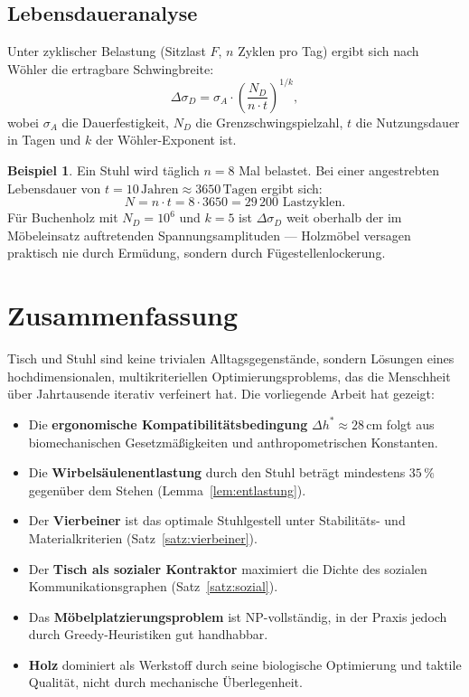 ﻿\documentclass[a4paper,12pt]{article}
\theoremstyle{definition}
\newtheorem{beispiel}{Beispiel}
\begin{document}
\subsection{Lebensdaueranalyse}

Unter zyklischer Belastung (Sitzlast $F$, $n$ Zyklen pro Tag) ergibt sich nach
W\"{o}hler die ertragbare Schwingbreite:
\[
	\Delta\sigma_D = \sigma_A \cdot \left(\frac{N_D}{n \cdot t}\right)^{1/k},
\]
wobei $\sigma_A$ die Dauerfestigkeit, $N_D$ die Grenzschwingspielzahl, $t$ die
Nutzungsdauer in Tagen und $k$ der W\"{o}hler-Exponent ist.

\begin{beispiel}
	Ein Stuhl wird t\"{a}glich $n = 8$ Mal belastet. Bei einer angestrebten Lebensdauer
	von $t = 10\,\text{Jahren} \approx 3650\,\text{Tagen}$ ergibt sich:
	\[
		N = n \cdot t = 8 \cdot 3650 = 29\,200 \text{ Lastzyklen.}
	\]
	F\"{u}r Buchenholz mit $N_D = 10^6$ und $k = 5$ ist $\Delta\sigma_D$ weit oberhalb
	der im M\"{o}beleinsatz auftretenden Spannungsamplituden --- Holzm\"{o}bel versagen
	praktisch nie durch Erm\"{u}dung, sondern durch F\"{u}gestellenlockerung.
\end{beispiel}

\section{Zusammenfassung}

Tisch und Stuhl sind keine trivialen Alltagsgegenst\"{a}nde, sondern L\"{o}sungen eines
hochdimensionalen, multikriteriellen Optimierungsproblems, das die Menschheit \"{u}ber
Jahrtausende iterativ verfeinert hat. Die vorliegende Arbeit hat gezeigt:
\begin{itemize}
	\item Die \textbf{ergonomische Kompatibilit\"{a}tsbedingung}
	      $\Delta h^* \approx 28\,\mathrm{cm}$ folgt aus biomechanischen
	      Gesetzm\"{a}\ss{}igkeiten und anthropometrischen Konstanten.
	\item Die \textbf{Wirbels\"{a}ulenentlastung} durch den Stuhl betr\"{a}gt mindestens
	      $35\,\%$ gegen\"{u}ber dem Stehen (Lemma~\ref{lem:entlastung}).
	\item Der \textbf{Vierbeiner} ist das optimale Stuhlgestell unter Stabilit\"{a}ts- und
	      Materialkriterien (Satz~\ref{satz:vierbeiner}).
	\item Der \textbf{Tisch als sozialer Kontraktor} maximiert die Dichte des sozialen
	      Kommunikationsgraphen (Satz~\ref{satz:sozial}).
	\item Das \textbf{M\"{o}belplatzierungsproblem} ist NP-vollst\"{a}ndig, in der Praxis
	      jedoch durch Greedy-Heuristiken gut handhabbar.
	\item \textbf{Holz} dominiert als Werkstoff durch seine biologische Optimierung und
	      taktile Qualit\"{a}t, nicht durch mechanische \"{U}berlegenheit.
\end{itemize}
\end{document}

